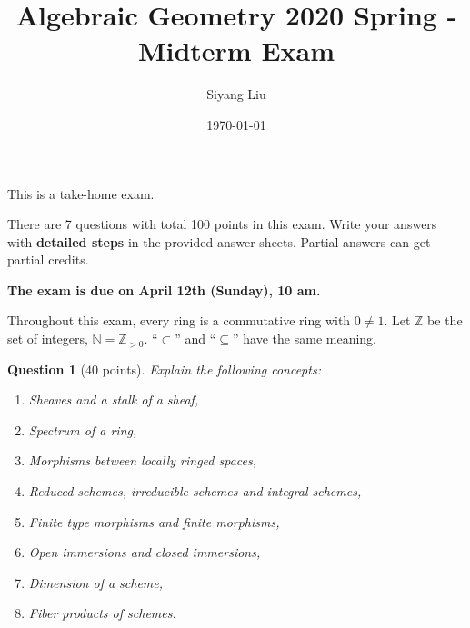 \documentclass[12pt]{amsart}
\title{Algebraic Geometry 2020 Spring - Midterm Exam}
\author{Siyang Liu}
\date{\today}
\newcommand{\Zz}{\mathbb{Z}}
\newcommand{\Nn}{\mathbb{N}}
\newtheorem{question}{Question}
\begin{document}
\maketitle


This is a take-home exam.

There are 7 questions with total 100 points in this exam. Write your answers with {\bf detailed steps} in the provided answer sheets. Partial answers can get partial credits. 

{\bf The exam is due on April 12th (Sunday), 10 am.}

\medskip

Throughout this exam, every ring is a commutative ring with $0 \neq 1$. Let $\Zz$ be the set of integers, $\Nn = \Zz_{>0}$. ``$\subset$'' and ``$\subseteq$'' have the same meaning.


\bigskip


\begin{question}[$40$ points]
Explain the following concepts:
\begin{enumerate}

\item Sheaves and a stalk of a sheaf,

\item Spectrum of a ring,

\item Morphisms between locally ringed spaces,

\item Reduced schemes, irreducible schemes and integral schemes,

\item Finite type morphisms and finite morphisms,

\item Open immersions and closed immersions,

\item Dimension of a scheme,

\item Fiber products of schemes.

\end{enumerate}
\end{question}
\end{document}

